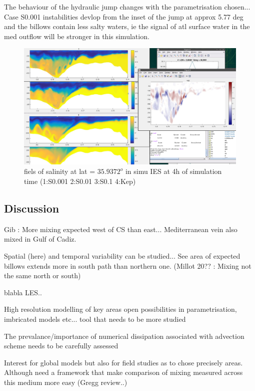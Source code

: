 The behaviour of the hydraulic jump changes with the parametrisation chosen... Case S0.001 instabilities devlop from the inset of the jump at approx 5.77 deg and the billows contain less salty waters, ie the signal of atl surface water in the med outflow will be stronger in this simulation.

\begin{figure}[!h]
 \includegraphics[width=\textwidth]{./GBR3D/Screen_Insta_fermSch.png}
 \caption {fiels of salinity at lat = $35.9372^o$ in simu IES at 4h of simulation time  (1:S0.001  2:S0.01  3:S0.1 4:Kep)}
\end{figure}



\subsection{Discussion}
Gib :
More mixing expected west of CS than east... Mediterranean vein also mixed in Gulf of Cadiz.

Spatial (here) and temporal variability can be studied... See area of expected billows extends more in south path than northern one. (Millot 20?? : Mixing not the same north or south)



blabla LES..

High resolution modelling of key areas open possibilities in parametrisation, imbricated models etc... tool that needs to be more studied 

The prevalance/importance of numerical dissipation associated with advection scheme needs to be carefully assessed

Interest for global models but also for field studies as to chose precisely areas. Although need a framework that make comparison of mixing measured across this medium more easy (Gregg review..)


